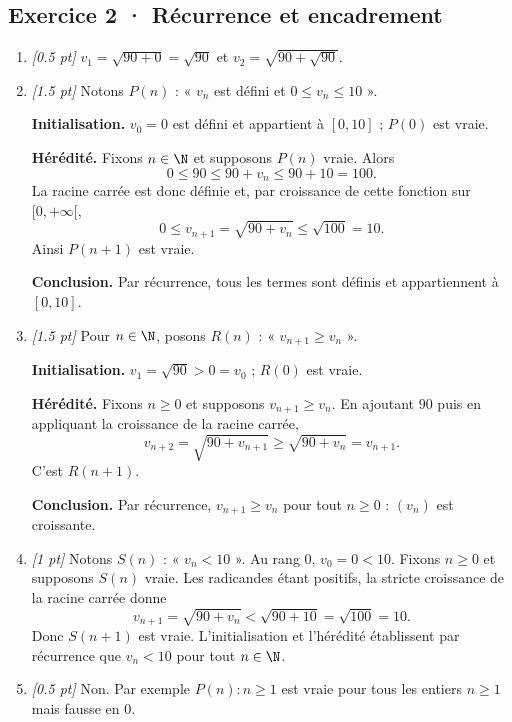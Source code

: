 \subsection*{Exercice 2 · Récurrence et encadrement}\begin{enumerate}

\item \textit{[\num{0,5} pt]} $v_1=\sqrt{90+0}=\sqrt{90}$ et $v_2=\sqrt{90+\sqrt{90}}$.

\item \textit{[\num{1,5} pt]} Notons $P(n)$ : « $v_n$ est défini et $0\le v_n\le 10$ ».
\par\smallskip\textbf{Initialisation.} $v_0=0$ est défini et appartient à $[0,10]$ ; $P(0)$ est vraie.
\par\smallskip\textbf{Hérédité.} Fixons $n\in\N$ et supposons $P(n)$ vraie. Alors
\[0\le 90\le 90+v_n\le 90+10=100.\]
La racine carrée est donc définie et, par croissance de cette fonction sur $[0,+\infty[$,
\[0\le v_{n+1}=\sqrt{90+v_n}\le\sqrt{100}=10.\]
Ainsi $P(n+1)$ est vraie.
\par\smallskip\textbf{Conclusion.} Par récurrence, tous les termes sont définis et appartiennent à $[0,10]$.

\item \textit{[\num{1,5} pt]} Pour $n\in\N$, posons $R(n)$ : « $v_{n+1}\ge v_n$ ».
\par\smallskip\textbf{Initialisation.} $v_1=\sqrt{90}>0=v_0$ ; $R(0)$ est vraie.
\par\smallskip\textbf{Hérédité.} Fixons $n\ge0$ et supposons $v_{n+1}\ge v_n$. En ajoutant $90$ puis en appliquant la croissance de la racine carrée,
\[v_{n+2}=\sqrt{90+v_{n+1}}\ge\sqrt{90+v_n}=v_{n+1}.\]
C'est $R(n+1)$.
\par\smallskip\textbf{Conclusion.} Par récurrence, $v_{n+1}\ge v_n$ pour tout $n\ge0$ : $(v_n)$ est croissante.

\item \textit{[1 pt]} Notons $S(n)$ : « $v_n<10$ ». Au rang $0$, $v_0=0<10$.
Fixons $n\ge0$ et supposons $S(n)$ vraie. Les radicandes étant positifs, la stricte croissance de la racine carrée donne
\[v_{n+1}=\sqrt{90+v_n}<\sqrt{90+10}=\sqrt{100}=10.\]
Donc $S(n+1)$ est vraie. L'initialisation et l'hérédité établissent par récurrence que $v_n<10$ pour tout $n\in\N$.

\item \textit{[\num{0,5} pt]} Non. Par exemple $P(n):n\ge1$ est vraie pour tous les entiers $n\ge1$ mais fausse en $0$.

\end{enumerate}

